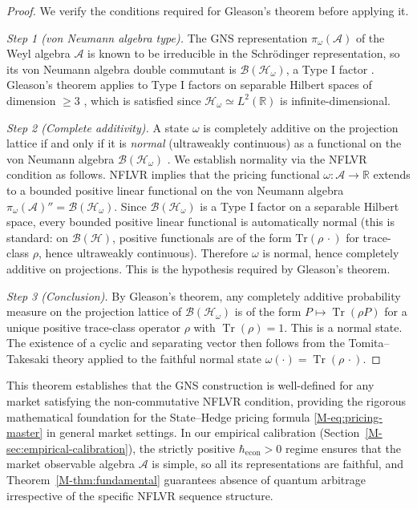 \begin{proof}
We verify the conditions required for Gleason's theorem before applying it.

\emph{Step 1 (von Neumann algebra type).} The GNS representation
$\pi_\omega(\mathcal{A})$ of the Weyl algebra $\mathcal{A}$ is known to be
irreducible in the Schr\"{o}dinger representation, so its von Neumann
algebra double commutant is $\mathcal{B}(\mathcal{H}_\omega)$, a Type I
factor \citep{bratteli1981operator}. Gleason's theorem applies to Type I
factors on separable Hilbert spaces of dimension $\geq 3$ \citep{gleason1957measures},
which is satisfied since $\mathcal{H}_\omega \simeq L^2(\mathbb{R})$ is
infinite-dimensional.

\emph{Step 2 (Complete additivity).} A state $\omega$ is completely additive
on the projection lattice if and only if it is \emph{normal} (ultraweakly
continuous) as a functional on the von Neumann algebra
$\mathcal{B}(\mathcal{H}_\omega)$ \citep{bratteli1981operator}. We establish
normality via the NFLVR condition as follows. NFLVR implies that the pricing
functional $\omega : \mathcal{A} \to \mathbb{R}$ extends to a bounded
positive linear functional on the von Neumann algebra
$\pi_\omega(\mathcal{A})'' = \mathcal{B}(\mathcal{H}_\omega)$.
Since $\mathcal{B}(\mathcal{H}_\omega)$ is a Type I factor on a separable
Hilbert space, every bounded positive linear functional is automatically
normal (this is standard: on $\mathcal{B}(\mathcal{H})$, positive
functionals are of the form $\mathrm{Tr}(\rho\,\cdot)$ for trace-class $\rho$,
hence ultraweakly continuous). Therefore $\omega$ is normal, hence completely
additive on projections. This is the hypothesis required by Gleason's theorem.

\emph{Step 3 (Conclusion).} By Gleason's theorem, any completely additive
probability measure on the projection lattice of $\mathcal{B}(\mathcal{H}_\omega)$
is of the form $P \mapsto \operatorname{Tr}(\rho P)$ for a unique positive
trace-class operator $\rho$ with $\operatorname{Tr}(\rho) = 1$. This is a
normal state. The existence of a cyclic and separating vector then follows
from the Tomita--Takesaki theory applied to the faithful normal state
$\omega(\cdot) = \operatorname{Tr}(\rho\,\cdot)$.
\end{proof}

This theorem establishes that the GNS construction is well-defined for any market
satisfying the non-commutative NFLVR condition, providing the rigorous
mathematical foundation for the State--Hedge pricing formula
\eqref{M-eq:pricing-master} in general market settings. In our empirical
calibration (Section~\ref{M-sec:empirical-calibration}), the strictly positive
$\hbar_{\mathrm{econ}} > 0$ regime ensures that the market observable algebra
$\mathcal{A}$ is simple, so all its representations are faithful, and
Theorem~\ref{M-thm:fundamental} guarantees absence of quantum arbitrage
irrespective of the specific NFLVR sequence structure.
